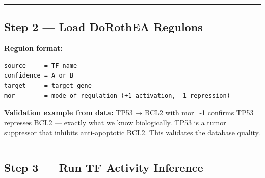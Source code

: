 \documentclass[
]{article}
\newenvironment{Shaded}{\begin{snugshade}}{\end{snugshade}}
\newcommand{\AttributeTok}[1]{\textcolor[rgb]{0.13,0.29,0.53}{#1}}
\newcommand{\CommentTok}[1]{\textcolor[rgb]{0.56,0.35,0.01}{\textit{#1}}}
\newcommand{\FunctionTok}[1]{\textcolor[rgb]{0.13,0.29,0.53}{\textbf{#1}}}
\newcommand{\NormalTok}[1]{#1}
\newcommand{\OtherTok}[1]{\textcolor[rgb]{0.56,0.35,0.01}{#1}}
\newcommand{\SpecialCharTok}[1]{\textcolor[rgb]{0.81,0.36,0.00}{\textbf{#1}}}
\newcommand{\StringTok}[1]{\textcolor[rgb]{0.31,0.60,0.02}{#1}}
\begin{document}
\begin{center}\rule{0.5\linewidth}{0.5pt}\end{center}

\subsection{Step 2 --- Load DoRothEA
Regulons}\label{step-2-load-dorothea-regulons}

\begin{Shaded}
\end{Shaded}

\textbf{Regulon format:}

\begin{verbatim}
source     = TF name
confidence = A or B
target     = target gene
mor        = mode of regulation (+1 activation, -1 repression)
\end{verbatim}

\textbf{Validation example from data:} TP53 → BCL2 with mor=-1 confirms
TP53 represses BCL2 --- exactly what we know biologically. TP53 is a
tumor suppressor that inhibits anti-apoptotic BCL2. This validates the
database quality.

\begin{center}\rule{0.5\linewidth}{0.5pt}\end{center}

\subsection{Step 3 --- Run TF Activity
Inference}\label{step-3-run-tf-activity-inference}
\end{document}
